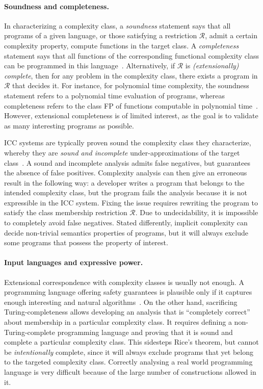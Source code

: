 \paragraph*{Soundness and completeness.}
In characterizing a complexity class,
a \emph{soundness} statement says that all programs of a given language, or those satisfying a restriction \(\mathcal{R}\), admit a certain complexity property, \ie compute functions in the target class.
A \emph{completeness} statement says that all functions of the corresponding functional complexity class can be programmed in this language~\cite{baillot2012}.
Alternatively, if \(\mathcal{R}\) is \emph{(extensionally) complete}, then for any problem in the complexity class, there exists a program in \(\mathcal{R}\) that decides it.
For instance, for polynomial time complexity, the soundness statement refers to a polynomial time evaluation of programs, whereas completeness refers to the class FP of functions computable in polynomial time~\cite{baillot2012}.
However, extensional completeness is of limited interest, as the goal is to validate as many interesting programs as possible.

ICC systems are typically proven sound \wrt the complexity class they characterize, whereby they are \emph{sound and incomplete} under-approximations of the target class~\cite[p. 125]{moyen2017}.
A sound and incomplete analysis admits false negatives, but guarantees the absence of false positives.
Complexity analysis can then give an erroneous result in the following way:
a developer writes a program that belongs to the intended complexity class,
but the program fails the analysis because it is not expressible in the ICC system.
Fixing the issue requires rewriting the program to satisfy the class membership restriction \(\mathcal{R}\).
Due to undecidability, it is impossible to completely avoid false negatives.
Stated differently, implicit complexity can decide non-trivial semantics properties of programs, but it will always exclude some programs that possess the property of interest.

\paragraph*{Input languages and expressive power.}
Extensional correspondence with complexity classes is usually not enough.
A programming language offering safety guarantees is plausible only
if it captures enough interesting and natural algorithms~\cite{baillot2012}.
On the other hand, sacrificing Turing-completeness allows developing an analysis that is \enquote{completely correct} about membership in a particular complexity class.
It requires defining a non-Turing-complete programming language and proving that it is sound and complete \wrt a particular complexity class.
This sidesteps Rice's theorem, but cannot be \emph{intentionally} complete, since it will always exclude programs that yet belong to the targeted complexity class.
Correctly analysing a real world programming language is very difficult because of the large number of constructions allowed in it.

